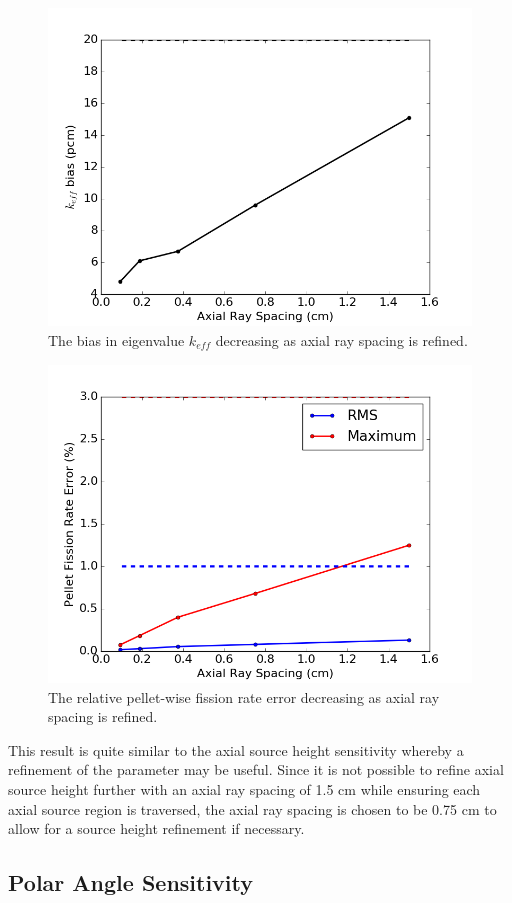 \begin{figure}[h!]
	\centering
	\includegraphics[width=0.7\linewidth]{figures/results/sensitivity/z_spacing_pcm.png}
	\caption[]{The bias in eigenvalue $k_{\textit{eff}}$ decreasing as axial ray spacing is refined.}
	\label{fig:axial-rs-pcm}
\end{figure}
\begin{figure}[h!]
	\centering
	\includegraphics[width=0.7\linewidth]{figures/results/sensitivity/z_spacing_fr.png}
	\caption[]{The relative pellet-wise fission rate error decreasing as axial ray spacing is refined.}
	\label{fig:axial-rs-fr}
\end{figure}

This result is quite similar to the axial source height sensitivity whereby a refinement of the parameter may be useful. Since it is not possible to refine axial source height further with an axial ray spacing of 1.5 cm while ensuring each axial source region is traversed, the axial ray spacing is chosen to be 0.75 cm to allow for a source height refinement if necessary.

\subsection{Polar Angle Sensitivity}
\label{sec:polar-angle-sensitivity}

